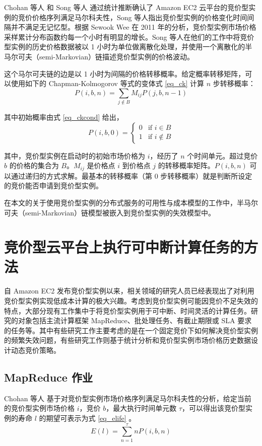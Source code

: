 Chohan 等人 \cite{chohan2010see} 和 Song 等人 \cite{song2012optimal} 通过统计推断确认了 Amazon EC2 云平台的竞价型实例的竞价价格序列满足马尔科夫性，Song 等人指出竞价型实例的价格变化时间间隔并不满足无记忆型。根据 Sewook Wee \cite{5948651} 在 2011 年的分析，竞价型实例市场价格采样累计分布函数约每一个小时有明显的增长。Song 等人在他们的工作中将竞价型实例的历史价格数据被以 1 小时为单位做离散化处理，并使用一个离散化的半马尔可夫（semi-Markovian）链描述竞价型实例的价格波动。

这个马尔可夫链的边是以 1 小时为间隔的价格转移概率。给定概率转移矩阵，可以使用如下的 Chapman-Kolmogorov 等式的变体式 \eqref{eq_ck} 计算 $n$ 步转移概率：
\begin{equation}\label{eq_ck} 
P(i, b, n) = \sum_{j \notin B}{M_{ij}P(j, b, n-1)}
\end{equation}

其中初始概率由式 \eqref{eq_ckcond} 给出，
\begin{equation}\label{eq_ckcond} 
P(i, b, 0) = 
\begin{cases}
0 &\mbox{if $i \in B$}\\
1 &\mbox{if $i \notin B$}
\end{cases}
\end{equation}

其中，竞价型实例在启动时的初始市场价格为 $i$，经历了 $n$ 个时间单元。超过竞价 $b$ 的价格的集合为 $B$。$M_{ij}$ 是价格点 $i$ 到价格点 $j$ 的转移概率矩阵。$P(i, b, n)$ 可以通过递归的方式求解。最基本的转移概率（第 0 步转移概率）就是判断所设定的竞价能否申请到竞价型实例。

在本文的关于使用竞价型实例的分布式服务的可用性与成本模型的工作中，半马尔可夫（semi-Markovian）链模型被嵌入到竞价型实例的失效模型中。

\section{竞价型云平台上执行可中断计算任务的方法}
自 Amazon EC2 发布竞价型实例以来，相关领域的研究人员已经表现出了对利用竞价型实例实现低成本计算的极大兴趣。考虑到竞价型实例可能因竞价不足失效的特点，大部分现有工作集中于将竞价型实例用于可中断、时间灵活的计算任务。研究的对象包括主流计算框架 MapReduce、批处理任务、有截止期限或 SLA 要求的任务等。其中有些研究工作主要考虑的是在一个固定竞价下如何解决竞价型实例的频繁失效问题，有些研究工作则基于统计分析和竞价型实例市场价格历史数据设计动态竞价策略。

\subsection{MapReduce 作业}
Chohan 等人 \cite{chohan2010see} 基于对竞价型实例市场价格序列满足马尔科夫性的分析，给定当前的竞价型实例市场价格 $i$，竞价 $b$，最大执行时间单元数 $\tau$，可以得出该竞价型实例的寿命 $l$ 的期望可表示为式 \eqref{eq_elife} 。
\begin{equation}\label{eq_elife} 
E(l) = \sum_{n=1}^{\tau}nP(i, b, n)
\end{equation}

